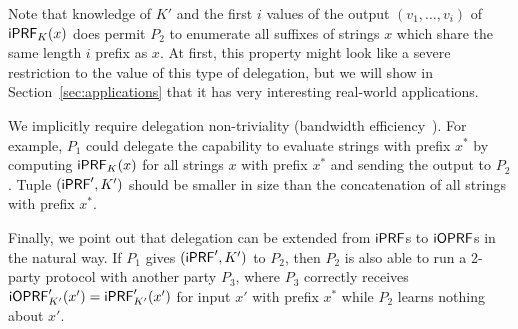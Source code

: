 Note that knowledge of $K'$ and the first $i$ values of the output
$(v_1,\ldots,v_i)$ of $\mathsf{i}\mathsf{PRF}_K(x)$ does permit $P_2$ to enumerate all
suffixes of strings $x$ which share the same length $i$ prefix as
$x$. At first, this property might look like a severe restriction to
the value of this type of delegation, but we will show in
Section~\ref{sec:applications} that it has very interesting
real-world applications.

We implicitly require delegation non-triviality (bandwidth
efficiency~\cite{delegate}). For example, $P_1$ could
delegate the capability to evaluate strings with prefix $x^*$ by
computing $\mathsf{i}\mathsf{PRF}_K(x)$ for all strings $x$ with prefix $x^*$
and sending the output to $P_2$. Tuple $(\mathsf{i}\mathsf{PRF}',K')$ should be
smaller in size than the concatenation of all strings with prefix
$x^*$.

Finally, we point out that delegation can be extended from $\mathsf{i}\mathsf{PRF}$s to
$\mathsf{i}\mathsf{OPRF}$s in the natural way. If $P_1$ gives $(\mathsf{i}\mathsf{PRF}',K')$ to $P_2$,
then $P_2$ is also able to run a 2-party protocol with another party
$P_3$, where $P_3$ correctly receives
$\mathsf{i}\mathsf{OPRF}'_{K'}(x')=\mathsf{i}\mathsf{PRF}'_{K'}(x')$ for input $x'$ with prefix $x^*$
while $P_2$ learns nothing about $x'$.


